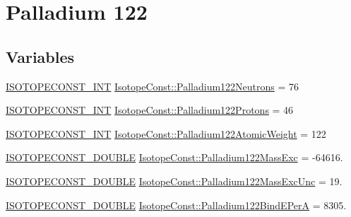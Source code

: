 \hypertarget{group___isotope_const-_palladium-_pd122}{}\section{Palladium 122}
\label{group___isotope_const-_palladium-_pd122}
\subsection*{Variables}
\begin{DoxyCompactItemize}
\item 
\mbox{\hyperlink{group___isotope_const-_macros_ga5f18360b3e99483a35c32d789e62621c}{I\+S\+O\+T\+O\+P\+E\+C\+O\+N\+S\+T\+\_\+\+I\+NT}} \mbox{\hyperlink{group___isotope_const-_palladium-_pd122_ga5332252686bb7505a5f0a98d0f99396d}{Isotope\+Const\+::\+Palladium122\+Neutrons}} = 76
\item 
\mbox{\hyperlink{group___isotope_const-_macros_ga5f18360b3e99483a35c32d789e62621c}{I\+S\+O\+T\+O\+P\+E\+C\+O\+N\+S\+T\+\_\+\+I\+NT}} \mbox{\hyperlink{group___isotope_const-_palladium-_pd122_ga20470d8b9891f7cfc9646a0a2ce9a1d1}{Isotope\+Const\+::\+Palladium122\+Protons}} = 46
\item 
\mbox{\hyperlink{group___isotope_const-_macros_ga5f18360b3e99483a35c32d789e62621c}{I\+S\+O\+T\+O\+P\+E\+C\+O\+N\+S\+T\+\_\+\+I\+NT}} \mbox{\hyperlink{group___isotope_const-_palladium-_pd122_ga61c837a0821dee8e2d500fe9221116b4}{Isotope\+Const\+::\+Palladium122\+Atomic\+Weight}} = 122
\item 
\mbox{\hyperlink{group___isotope_const-_macros_ga8f45a7272ce02c0b4c65c44636ed719a}{I\+S\+O\+T\+O\+P\+E\+C\+O\+N\+S\+T\+\_\+\+D\+O\+U\+B\+LE}} \mbox{\hyperlink{group___isotope_const-_palladium-_pd122_ga6dd92d8a7108109f6b95e90af75a8eb0}{Isotope\+Const\+::\+Palladium122\+Mass\+Exc}} = -\/64616.
\item 
\mbox{\hyperlink{group___isotope_const-_macros_ga8f45a7272ce02c0b4c65c44636ed719a}{I\+S\+O\+T\+O\+P\+E\+C\+O\+N\+S\+T\+\_\+\+D\+O\+U\+B\+LE}} \mbox{\hyperlink{group___isotope_const-_palladium-_pd122_gaf87906fa5671f7d7909d2ced56e21cc5}{Isotope\+Const\+::\+Palladium122\+Mass\+Exc\+Unc}} = 19.
\item 
\mbox{\hyperlink{group___isotope_const-_macros_ga8f45a7272ce02c0b4c65c44636ed719a}{I\+S\+O\+T\+O\+P\+E\+C\+O\+N\+S\+T\+\_\+\+D\+O\+U\+B\+LE}} \mbox{\hyperlink{group___isotope_const-_palladium-_pd122_gafbafd4940a04622e6065937814303f53}{Isotope\+Const\+::\+Palladium122\+Bind\+E\+PerA}} = 8305.
\item 

\end{DoxyCompactItemize}
